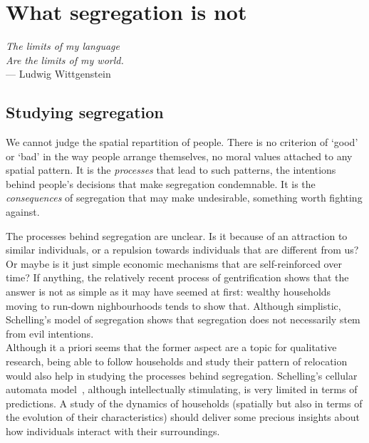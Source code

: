 \chapter{What segregation is not}

\begin{flushright}{\slshape    
The limits of my language\\
Are the limits of my world.} \\ \medskip
--- Ludwig Wittgenstein 
\end{flushright}


\bigskip


\newcommand{\E}{\mathrm{E}}
\newcommand{\Var}{\mathrm{Var}}

\section{Studying segregation}
\label{sec:studying_segregation}


We cannot judge the spatial repartition of people. There is no criterion of
`good' or `bad' in the way people arrange themselves, no moral values attached
to any spatial pattern. It is the \emph{processes} that lead to such patterns,
the intentions behind people's decisions that make segregation condemnable. It
is the \emph{consequences} of segregation that may make undesirable, something
worth fighting against. 

The processes behind segregation are unclear. Is it
because of an attraction to similar individuals, or a repulsion towards
individuals that are different from us? Or maybe is it just simple economic
mechanisms that are self-reinforced over time? If anything, the relatively
recent process of gentrification shows that the answer is not as simple as it
may have seemed at first: wealthy households moving to run-down nighbourhoods
tends to show that. Although simplistic, Schelling's model of segregation shows
that segregation does not necessarily stem from evil intentions.\\
Although it a priori seems that
the former aspect are a topic for qualitative research, being able to follow
households and study their pattern of relocation would also help in studying
the processes behind segregation. Schelling's cellular automata
model~\cite{Schelling:1971}, although intellectually stimulating, is very
limited in terms of predictions. A study of the dynamics of households
(spatially but also in terms of the evolution of their characteristics) should
deliver some precious insights about how individuals interact with their
surroundings.

